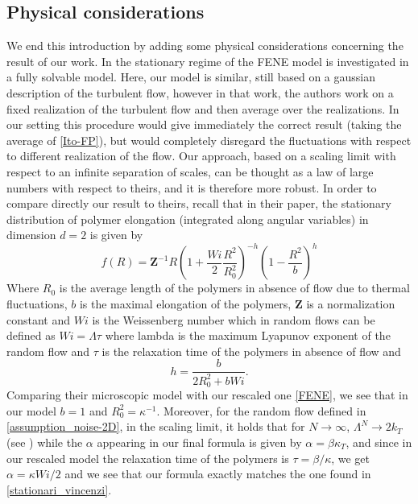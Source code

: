 \documentclass[a4paper,12pt, reqno]{amsart}
\renewcommand{\k}{\kappa}
\begin{document}
\subsection{Physical considerations}\label{sect-physics}
We end this introduction by adding some physical considerations concerning the result of our work. In \cite{Afonso2005nonlinear} the stationary regime of the FENE model is investigated in a fully solvable model. Here, our model is similar, still based on a gaussian description of the turbulent flow, however in that work, the authors work on a fixed realization of the turbulent flow and then average over the realizations. In our setting this procedure would give immediately the correct result (taking the average of \eqref{Ito-FP}), but would completely disregard the fluctuations with respect to different realization of the flow. Our approach, based on a scaling limit with respect to an infinite separation of scales, can be thought as a law of large numbers with respect to theirs, and it is therefore more robust. In order to compare directly our result to theirs, recall that in their paper, the stationary distribution of polymer elongation (integrated along angular variables) in dimension $d=2$ is given by 
\begin{equation}\label{stationari_vincenzi}
f(R)=  \mathbf{Z}^{-1} R\left(1+ \frac{Wi}{2}\frac{R^2}{R_0^2}\right)^{-h}\left(1 - \frac{R^2}{b}\right)^h
\end{equation}
Where $R_0$ is the average length of the polymers in absence of flow due to thermal fluctuations, $b$ is the maximal elongation of the polymers, $\mathbf{Z}$ is a normalization constant and $Wi$ is the Weissenberg number which in random flows can be defined as $Wi=\Lambda \tau$ where lambda is the maximum Lyapunov exponent of the random flow and $\tau$ is the relaxation time of the polymers in absence of flow and 
$$h=\frac{b}{2{R_0^2} + bWi}.$$
Comparing their microscopic model with our rescaled one \eqref{FENE}, we see that in our model $b=1$ and $R_0^2= \kappa^{-1}$. Moreover, for the random flow defined in \autoref{assumption_noise-2D}, in the scaling limit, it holds that for $N\rightarrow \infty$, $\Lambda^N\rightarrow  2k_T$ (see \cite{monin_statistical_1987})
while the $\alpha$ appearing in our final formula is given by $\alpha= \beta \kappa_T$, and since in our rescaled model the relaxation time of the polymers is $\tau=\beta/\kappa$, we get $\alpha = \k Wi /2$ and
we see that our formula exactly matches the one found in \eqref{stationari_vincenzi}. \\
\end{document}
